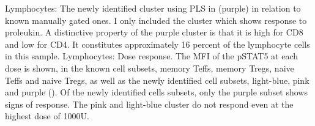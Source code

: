 { Lymphocytes: The newly identified cluster using \gls{PLS} in  (purple) in relation to known manually gated ones. }
{
    I only included the cluster which shows response to proleukin.
    A distinctive property of the purple cluster is that it is high for CD8 and low for CD4.
    It constitutes approximately 16 percent of the lymphocyte cells in this sample.
}
{ Lymphocytes: Dose response. }
{
    The MFI of the pSTAT5 at each dose is shown, in the known cell subsets, memory Teffs, memory Tregs, naive Teffs
    and naive Tregs, as well as the newly identified cell subsets, light-blue, pink and purple ().
    Of the newly identified cells subsets, only the purple subset shows signs of response.
    The pink and light-blue cluster do not respond even at the highest dose of 1000U.
}
\clearpage



